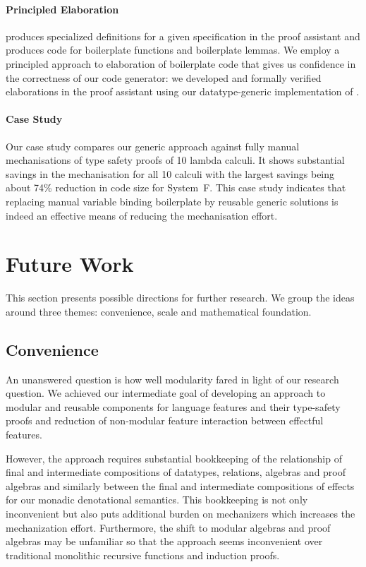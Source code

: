 \paragraph{Principled Elaboration}
\Needle produces specialized definitions for a given \Knot specification in the
\Coq proof assistant and produces code for boilerplate functions and boilerplate
lemmas. We employ a principled approach to elaboration of boilerplate code that
gives us confidence in the correctness of our code generator: we developed and
formally verified elaborations in the \Coq proof assistant using our
datatype-generic implementation \Loom of \Knot.

\paragraph{Case Study}
Our case study compares our generic approach against fully manual mechanisations
of type safety proofs of 10 lambda calculi. It shows substantial savings in the
mechanisation for all 10 calculi with the largest savings being about 74\%
reduction in code size for System~F. This case study indicates that replacing
manual variable binding boilerplate by reusable generic solutions is indeed an
effective means of reducing the mechanisation effort.


\section{Future Work}

This section presents possible directions for further research. We group the
ideas around three themes: convenience, scale and mathematical foundation.

\subsection{Convenience}

An unanswered question is how well modularity fared in light of our research
question. We achieved our intermediate goal of developing an approach to modular
and reusable components for language features and their type-safety proofs and
reduction of non-modular feature interaction between effectful features.

However, the approach requires substantial bookkeeping of the relationship of
final and intermediate compositions of datatypes, relations, algebras and proof
algebras and similarly between the final and intermediate compositions of
effects for our monadic denotational semantics. This bookkeeping is not only
inconvenient but also puts additional burden on mechanizers which increases the
mechanization effort. Furthermore, the shift to modular algebras and proof
algebras may be unfamiliar so that the approach seems inconvenient over
traditional monolithic recursive functions and induction proofs.

